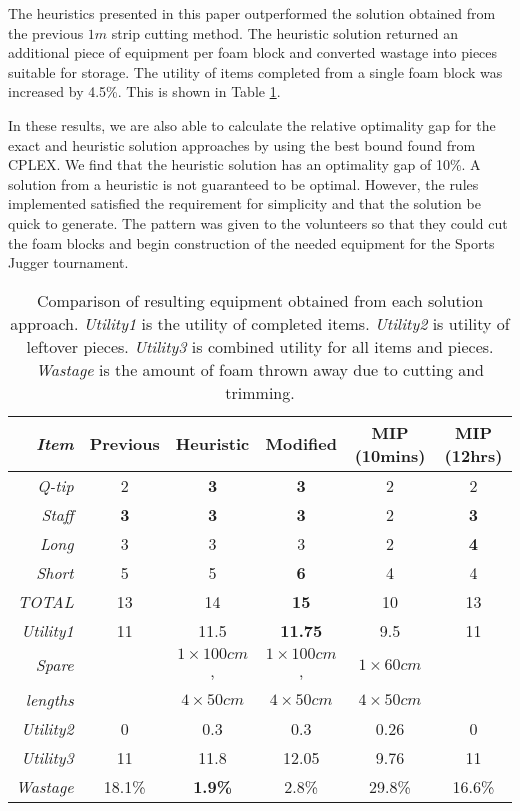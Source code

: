 \documentclass[10pt,a4paper]{article}
\begin{document}
The heuristics presented in this paper outperformed the solution obtained from the previous $1m$ strip cutting method. The heuristic solution returned an additional piece of equipment per foam block and converted wastage into pieces suitable for storage. The utility of items completed from a single foam block was increased by 4.5\%. This is shown in Table \ref{tab:compare_results}. 

In these results, we are also able to calculate the relative optimality gap for the exact and heuristic solution approaches by using the best bound found from CPLEX. We find that the heuristic solution has an optimality gap of 10\%. A solution from a heuristic is not guaranteed to be optimal. However, the rules implemented satisfied the requirement for simplicity and that the solution be quick to generate. The pattern was given to the volunteers so that they could cut the foam blocks and begin construction of the needed equipment for the Sports Jugger tournament.


\begin{table}
\begin{tabular}{r|ccccc}
\textit{Item} & Previous & Heuristic & Modified & MIP (10mins) & MIP (12hrs)\\\hline
\textit{Q-tip} &2&\textbf{3}&\textbf{3}&2&2\\
\textit{Staff}  &\textbf{3}&\textbf{3}&\textbf{3}&2&\textbf{3}\\
\textit{Long}&3&3&3&2&\textbf{4}\\
\textit{Short} &5&5&\textbf{6}&4&4\\\hline
\textit{TOTAL} &13&14&\textbf{15}&10&13\\
\textit{Utility1} &11 &11.5 &\textbf{11.75} &9.5& 11\\
\textit{Spare} &&$1\times 100cm$,&$1\times 100cm$,&$1\times 60cm$&\\
\textit{lengths}& &$4 \times 50cm$ &$4 \times 50cm$ &$4 \times 50cm$ & \\
\textit{Utility2} &0&0.3&0.3&0.26&0\\
\textit{Utility3} &11&11.8&12.05&9.76&11\\
\textit{Wastage} & 18.1\% &\textbf{1.9\%} &2.8\% &29.8\%&16.6\%\\\hline
\end{tabular}
\caption{Comparison of resulting equipment obtained from each solution approach. \textit{Utility1} is the utility of completed items. \textit{Utility2} is utility of leftover pieces. \textit{Utility3} is combined utility for all items and pieces. \textit{Wastage} is the amount of foam thrown away due to cutting and trimming.}
\label{tab:compare_results}
\end{table}
\end{document}
